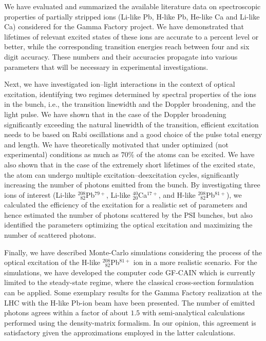 \documentclass[superscriptaddress,
amsmath,amssymb%
pra,twocolumn,
floatfix
]{revtex4-2}
\begin{document}
We have evaluated and summarized the available literature data on spectroscopic properties of partially stripped ions (Li-like Pb, H-like Pb, He-like Ca and Li-like Ca) considered for the Gamma Factory project. We have demonstrated that lifetimes of relevant excited states of these ions are accurate to a percent level or better, while the corresponding transition energies reach between four and six digit accuracy. These numbers and their accuracies propagate into various parameters that will be necessary in experimental investigations.

Next, we have investigated ion--light interactions in the context of optical excitation, identifying two regimes determined by spectral properties of the ions in the bunch, i.e., the transition linewidth and the Doppler broadening, and the light pulse. We have shown that in the case of the Doppler broadening significantly exceeding the natural linewidth of the transition, efficient excitation needs to be based on Rabi oscillations and a good choice of the pulse total energy and length. We have theoretically motivated that under optimized (not experimental) conditions as much as $70\%$ of the atoms can be excited. We have also shown that in the case of the extremely short lifetimes of the excited state, the atom can undergo multiple excitation--deexcitation cycles, significantly increasing the number of photons emitted from the bunch. By investigating three ions of interest (Li-like ${}^{208}_{\phantom{0}82}$Pb$^{79+}$, Li-like ${}^{40}_{20}$Ca$^{17+}$, and H-like ${}^{208}_{\phantom{0}82}$Pb$^{81+}$), we calculated the efficiency of the excitation for a realistic set of parameters and hence estimated the number of photons scattered by the PSI bunches, but also identified the parameters optimizing the optical excitation and maximizing the number of scattered photons.

Finally, we have described Monte-Carlo simulations considering the process of the optical excitation of the H-like ${}^{208}_{\phantom{0}82}$Pb$^{81+}$ ion in a more realistic scenario.  For the simulations, we have developed the computer code {\sf GF-CAIN} which is currently limited to the steady-state regime, where the classical cross-section formulation can be applied.  Some exemplary results for the Gamma Factory realization at the LHC with the H-like Pb-ion beam have been presented.  The number of emitted photons agrees within a factor of about $1.5$ with semi-analytical calculations performed using the density-matrix formalism.  In our opinion, this agreement is satisfactory given the approximations employed in the latter calculations. 
\end{document}
